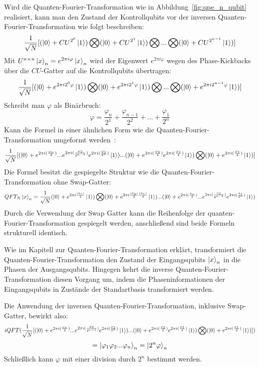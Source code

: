 Wird die Quanten-Fourier-Transformation wie in Abbildung~\ref{fig:qpe_n_qubit} realisiert,
kann man den Zustand der Kontrollqubits vor der inversen Quanten-Fourier-Transformation wie folgt beschreiben:
\[\frac{1}{\sqrt{N}}[
  (\ket{0} + CU^{2^0}\ket{1}) \operatorname{\bigotimes}
  (\ket{0} + CU^{2^1}\ket{1}) \operatorname{\bigotimes} 
  ... \operatorname{\bigotimes}
  (\ket{0} + CU^{2^{n-1}}\ket{1}) 
]\]
Mit \(U^{n\times n}\ket{x}_n=e^{2\pi i \varphi}\ket{x}_n\) wird der Eigenwert \(e^{2\pi i \varphi}\) wegen des Phase-Kickbacks
über die \(CU\)-Gatter auf die Kontrollqubits übertragen:
\[\frac{1}{\sqrt{N}}[
  (\ket{0} + e^{2\pi i 2^0 \varphi}\ket{1}) \operatorname{\bigotimes}
  (\ket{0} + e^{2\pi i 2^1 \varphi}\ket{1}) \operatorname{\bigotimes} 
  ... \operatorname{\bigotimes}
  (\ket{0} + e^{2\pi i 2^{n-1} \varphi}\ket{1}) 
]\]
Schreibt man \(\varphi\) als Binärbruch:
\[\varphi = \frac{\varphi_n}{2^1} + \frac{\varphi_{n-1}}{2^2} + ... + \frac{\varphi_1}{2^n}\]
Kann die Formel in einer ähnlichen Form wie die Quanten-Fourier-Transformation umgeformt werden~\cite{nielsen_chuang_2010}:
\[\frac{1}{\sqrt{N}}[
  (\ket{0} + e^{2\pi i (\frac{\varphi_n}{2})} ... e^{2\pi i (\frac{\varphi_2}{2^{n-1}})}e^{2\pi i (\frac{\varphi_1}{2^{n}})}\ket{1})  ... 
  (\ket{0} +  e^{2\pi i (\frac{\varphi_2}{2})}e^{2\pi i (\frac{\varphi_1}{4})}\ket{1}) \operatorname{\bigotimes} 
  (\ket{0} + e^{2\pi i (\frac{\varphi_1}{2})}\ket{1}) 
]\]
Die Formel besitzt die gespiegelte Struktur wie die Quanten-Fourier-Transformation ohne Swap-Gatter:
\[QFT_{N}\ket{x}_{n} = \frac{1}{\sqrt{N}}(\ket{0} + { e^{2 \pi i \frac{(x_1)}{2}}}\ket{1}) \operatorname{\bigotimes}
( \ket{0} + { e^{2 \pi i \frac{(x_2)}{2}\frac{(x_1)}{4}}}\ket{1})...
(\ket{0} + e^{2\pi i (\frac{x_n}{2})} ... e^{2\pi i (\frac{x_2}{2^{n-1}})}e^{2\pi i (\frac{x_1}{2^{n}})}\ket{1})\]
Durch die Verwendung der Swap Gatter kann die Reihenfolge der quanten-Fourier-Transformation gespiegelt werden, 
anschließend sind beide Formeln strukturell identisch.

Wie im Kapitell zur Quanten-Fourier-Transformation erklärt,
transformiert die Quanten-Fourier-Transformation den Zustand der Eingangsqubits \(\ket{x}_n\) in die Phasen der Ausgangsqubits.
Hingegen kehrt die inverse Quanten-Fourier-Transformation diesen Vorgang um, 
indem die Phaseninformationen der Eingangsqubits in Zustände der Standartbasis transformiert werden.

Die Anwendung der inversen Quanten-Fourier-Transformation, inklusive Swap-Gatter, bewirkt also:
\[iQFT(\frac{1}{\sqrt{N}}[
  (\ket{0} + e^{2\pi i (\frac{\varphi_n}{2})} ... e^{2\pi i (\frac{\varphi_2}{2^{n-1}})}e^{2\pi i (\frac{\varphi_1}{2^{n}})}\ket{1})  ... 
  (\ket{0} +  e^{2\pi i (\frac{\varphi_2}{2})}e^{2\pi i (\frac{\varphi_1}{4})}\ket{1}) \operatorname{\bigotimes} 
  (\ket{0} + e^{2\pi i (\frac{\varphi_1}{2})}\ket{1}) 
])\]
\[ = \ket{\varphi_1 \varphi_{2}...\varphi_n}_n = \ket{2^n\varphi}_n\]
Schließlich kann \(\varphi\) mit einer division durch \(2^n\) bestimmt werden.

